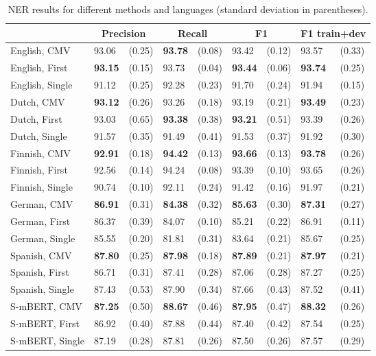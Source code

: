 \documentclass[11pt]{article}
\begin{document}
\begin{table*}[t!]
\centering
\begin{tabular}{ll@{\hskip 5pt}cl@{\hskip 5pt}cl@{\hskip 5pt}cl@{\hskip 5pt}c}
                            & \multicolumn{2}{c}{Precision} & \multicolumn{2}{c}{Recall} & \multicolumn{2}{c}{F1} & \multicolumn{2}{c}{F1 train+dev} \\ \hline
English, CMV             & 93.06 & (0.25) & \textbf{93.78} & (0.08) & 93.42 & (0.12) & 93.57 & (0.33) \\  English, First          & \textbf{93.15} & (0.15) & 93.73 & (0.04) & \textbf{93.44} & (0.06) & \textbf{93.74} & (0.25)\\ English, Single         & 91.12 & (0.25) & 92.28 & (0.23) & 91.70 & (0.24) & 91.94 & (0.15)\\ \hline Dutch, CMV               & \textbf{93.12} & (0.26) & 93.26 & (0.18) & 93.19 & (0.21) &  \textbf{93.49} &  (0.23) \\ Dutch, First            & 93.03 & (0.65) & \textbf{93.38} & (0.38) & \textbf{93.21} & (0.51) & 93.39 & (0.26)\\ Dutch, Single           & 91.57 & (0.35) & 91.49 & (0.41) & 91.53 & (0.37) & 91.92 & (0.30)\\ \hline Finnish, CMV             & \textbf{92.91} & (0.18) & \textbf{94.42} & (0.13) & \textbf{93.66} & (0.13) & \textbf{93.78} & (0.26)\\ Finnish, First          & 92.56 & (0.14) & 94.24 & (0.08) & 93.39 & (0.10) & 93.65 & (0.26) \\ Finnish, Single         & 90.74 & (0.10) & 92.11 & (0.24) & 91.42 & (0.16) & 91.97 & (0.21) \\ \hline German, CMV              & \textbf{86.91} & (0.31) & \textbf{84.38} & (0.32) & \textbf{85.63} & (0.30) & \textbf{87.31} & (0.27)\\ German, First           & 86.37 & (0.39) & 84.07 & (0.10) & 85.21 & (0.22) & 86.91 & (0.11)\\ German, Single          & 85.55 & (0.20) & 81.81 & (0.31) & 83.64 & (0.21) & 85.67 & (0.25)\\ \hline Spanish, CMV              & \textbf{87.80} & (0.25) & \textbf{87.98} & (0.18) & \textbf{87.89} & (0.21) & \textbf{87.97} & (0.21)\\ Spanish, First           & 86.71 & (0.31) & 87.41 & (0.28) & 87.06 & (0.28) & 87.27 & (0.25)\\ Spanish, Single         & 87.43 & (0.53) & 87.90 & (0.34) & 87.66 & (0.43) & 87.52 & (0.41)\\ \hline S-mBERT, CMV              & \textbf{87.25} & (0.50) & \textbf{88.67} & (0.46) & \textbf{87.95} & (0.47) & \textbf{88.32} & (0.26)\\ S-mBERT, First          & 86.92 & (0.40) & 87.88 & (0.44) & 87.40  & (0.42) & 87.54 & (0.25) \\ S-mBERT, Single         & 87.19 & (0.28) & 87.81 & (0.26) & 87.50 & (0.26) & 87.57 & (0.29) \\ \hline \end{tabular}
\caption{NER results for different methods and languages (standard deviation in parentheses).}
\label{ner-results-language}
\end{table*}
\end{document}
